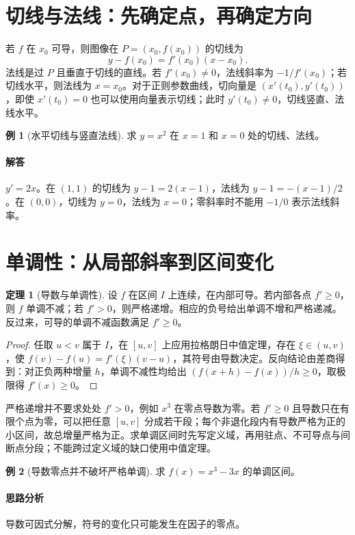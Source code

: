 \documentclass[UTF8,fontset=fandol,12pt,oneside,openany]{ctexrep}
\theoremstyle{definition}
\newtheorem{theorem}{定理}[chapter]
\newtheorem{example}{例}[chapter]
\begin{document}
\section{切线与法线：先确定点，再确定方向}
若 $f$ 在 $x_0$ 可导，则图像在 $P=(x_0,f(x_0))$ 的切线为
\[y-f(x_0)=f'(x_0)(x-x_0).\]
法线是过 $P$ 且垂直于切线的直线。若 $f'(x_0)\ne0$，法线斜率为 $-1/f'(x_0)$；若切线水平，则法线为 $x=x_0$。对于正则参数曲线，切向量是 $(x'(t_0),y'(t_0))$，即使 $x'(t_0)=0$ 也可以使用向量表示切线；此时 $y'(t_0)\ne0$，切线竖直、法线水平。
\begin{example}[水平切线与竖直法线]
求 $y=x^2$ 在 $x=1$ 和 $x=0$ 处的切线、法线。
\end{example}
\paragraph{解答}$y'=2x$。在 $(1,1)$ 的切线为 $y-1=2(x-1)$，法线为 $y-1=-(x-1)/2$。在 $(0,0)$，切线为 $y=0$，法线为 $x=0$；零斜率时不能用 $-1/0$ 表示法线斜率。

\section{单调性：从局部斜率到区间变化}
\label{lec:09:monotonicity}
\begin{theorem}[导数与单调性]
设 $f$ 在区间 $I$ 上连续，在内部可导。若内部各点 $f'\ge0$，则 $f$ 单调不减；若 $f'>0$，则严格递增。相应的负号给出单调不增和严格递减。反过来，可导的单调不减函数满足 $f'\ge0$。
\end{theorem}
\begin{proof}
任取 $u<v$ 属于 $I$，在 $[u,v]$ 上应用拉格朗日中值定理，存在 $\xi\in(u,v)$，使 $f(v)-f(u)=f'(\xi)(v-u)$，其符号由导数决定。反向结论由差商得到：对正负两种增量 $h$，单调不减性均给出 $(f(x+h)-f(x))/h\ge0$，取极限得 $f'(x)\ge0$。
\end{proof}
严格递增并不要求处处 $f'>0$，例如 $x^3$ 在零点导数为零。若 $f'\ge0$ 且导数只在有限个点为零，可以把任意 $[u,v]$ 分成若干段；每个非退化段内有导数严格为正的小区间，故总增量严格为正。求单调区间时先写定义域，再用驻点、不可导点与间断点分段；不能跨过定义域的缺口使用中值定理。

\begin{example}[导数零点并不破坏严格单调]
求 $f(x)=x^3-3x$ 的单调区间。
\end{example}
\paragraph{思路分析}导数可因式分解，符号的变化只可能发生在因子的零点。
\end{document}
